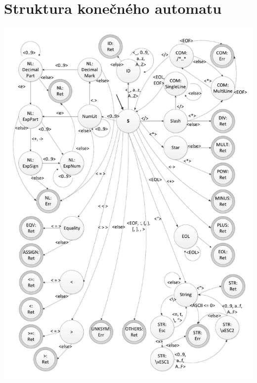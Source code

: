 \documentclass[a4paper, 12pt]{article}[5.12.2012]
\begin{document}
\section{Struktura konečného automatu} \label{a:fsm}
  \centering
  \includegraphics[scale=0.8]{fsm.pdf}
\end{document}
